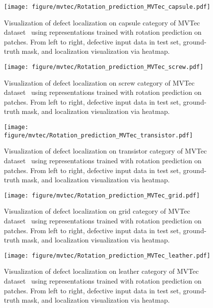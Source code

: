 \documentclass{article} \usepackage{iclr2021_conference,times}
\begin{document}
\begin{figure}
    \centering
    \texttt{[image: figure/mvtec/Rotation\_prediction\_MVTec\_capsule.pdf]}
    \caption{Visualization of defect localization on capsule category of MVTec dataset~\cite{bergmann2019mvtec} using representations trained with rotation prediction on patches. From left to right, defective input data in test set, ground-truth mask, and localization visualization via heatmap.}
    \label{fig:mvtec_capsule}
\end{figure}

\begin{figure}
    \centering
    \texttt{[image: figure/mvtec/Rotation\_prediction\_MVTec\_screw.pdf]}
    \caption{Visualization of defect localization on screw category of MVTec dataset~\cite{bergmann2019mvtec} using representations trained with rotation prediction on patches. From left to right, defective input data in test set, ground-truth mask, and localization visualization via heatmap.}
    \label{fig:mvtec_screw}
\end{figure}

\begin{figure}
    \centering
    \texttt{[image: figure/mvtec/Rotation\_prediction\_MVTec\_transistor.pdf]}
    \caption{Visualization of defect localization on transistor category of MVTec dataset~\cite{bergmann2019mvtec} using representations trained with rotation prediction on patches. From left to right, defective input data in test set, ground-truth mask, and localization visualization via heatmap.}
    \label{fig:mvtec_transistor}
\end{figure}

\begin{figure}
    \centering
    \texttt{[image: figure/mvtec/Rotation\_prediction\_MVTec\_grid.pdf]}
    \caption{Visualization of defect localization on grid category of MVTec dataset~\cite{bergmann2019mvtec} using representations trained with rotation prediction on patches. From left to right, defective input data in test set, ground-truth mask, and localization visualization via heatmap.}
    \label{fig:mvtec_grid}
\end{figure}

\begin{figure}
    \centering
    \texttt{[image: figure/mvtec/Rotation\_prediction\_MVTec\_leather.pdf]}
    \caption{Visualization of defect localization on leather category of MVTec dataset~\cite{bergmann2019mvtec} using representations trained with rotation prediction on patches. From left to right, defective input data in test set, ground-truth mask, and localization visualization via heatmap.}
    \label{fig:mvtec_leather}
\end{figure}
\end{document}
